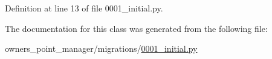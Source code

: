 Definition at line 13 of file 0001\-\_\-initial.\-py.



The documentation for this class was generated from the following file\-:\begin{DoxyCompactItemize}
\item 
owners\-\_\-point\-\_\-manager/migrations/\hyperlink{owners__point__manager_2migrations_20001__initial_8py}{0001\-\_\-initial.\-py}\end{DoxyCompactItemize}
